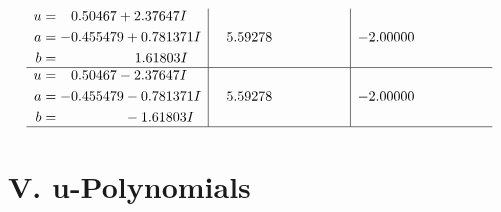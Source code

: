 \documentclass[1p]{elsarticle_modified}
\theoremstyle{definition}
\begin{document}
$$\begin{array}{c|c|c}
\begin{aligned}
u &= \phantom{-}0.50467 + 2.37647 I \\
a &= -0.455479 + 0.781371 I \\
b &= \phantom{-0.000000 -}1.61803 I\end{aligned}
 & \phantom{-}5.59278\phantom{ +0.000000I} & -2.00000\phantom{ +0.000000I} \\ \hline\begin{aligned}
u &= \phantom{-}0.50467 - 2.37647 I \\
a &= -0.455479 - 0.781371 I \\
b &= \phantom{-0.000000 } -1.61803 I\end{aligned}
 & \phantom{-}5.59278\phantom{ +0.000000I} & -2.00000\phantom{ +0.000000I}\\
 \hline 
 \end{array}$$\newpage
\newpage\renewcommand{\arraystretch}{1}
\centering \section*{ V. u-Polynomials}
\end{document}
